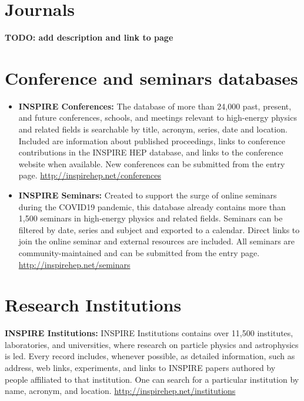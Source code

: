 \section{Journals}\label{databases:sec:journals}

\textbf{TODO: add description and link to page}

\section{Conference and seminars databases}\label{databases:sec:conference}
\begin{itemize}
\tightlist
\item
  \textbf{INSPIRE Conferences:} The database of more than 24,000 past,
  present, and future conferences, schools, and meetings relevant to
  high-energy physics and related fields is searchable by title,
  acronym, series, date and location. Included are information about
  published proceedings, links to conference contributions in the
  INSPIRE HEP database, and links to the conference website when
  available. New conferences can be submitted from the entry page.
  \url{http://inspirehep.net/conferences}
\item
  \textbf{INSPIRE Seminars:} Created to support the surge of online seminars during
  the COVID19 pandemic, this database already contains more than 1,500
  seminars in high-energy physics and related fields. Seminars can be filtered
  by date, series and subject and exported to a calendar. Direct links to join
  the online seminar and external resources are included. All seminars are
  community-maintained and can be submitted from the entry page.
  \url{http://inspirehep.net/seminars}
\end{itemize}

\section{Research Institutions}\label{databases:sec:research}


  \textbf{INSPIRE Institutions:} INSPIRE Institutions contains over
  11,500 institutes, laboratories, and universities, where research on
  particle physics and astrophysics is led. Every record includes,
  whenever possible, as detailed information, such as address, web
  links, experiments, and links to INSPIRE papers authored by people
  affiliated to that institution. One can search for a particular
  institution by name, acronym, and location.
  \url{http://inspirehep.net/institutions}

